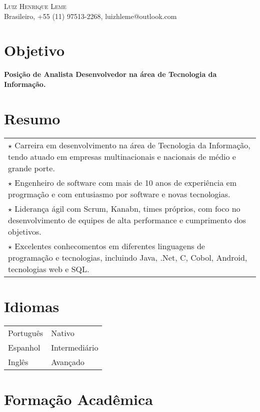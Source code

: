 \documentclass[a4paper, oneside, final]{scrartcl}
\newcommand{\vspc}{\vspace{0.15cm}} %
\begin{document}
\begin{center}
\textsc{\Huge{Luiz Henrique Leme}} \vspc\\
{\small Brasileiro, +55 (11) 97513-2268, luizhleme@outlook.com}

\section{Objetivo}
	{\large \bf Posição de Analista Desenvolvedor na área de Tecnologia da Informação.}
	
\section{Resumo}

\begin{tabularx}{1\linewidth}{X}
	$\star$ Carreira em desenvolvimento na área de Tecnologia da Informação, tendo atuado em empresas multinacionais e nacionais de médio e grande porte. \vspc\\
	
	$\star$ Engenheiro de software com mais de 10 anos de experiência em progrmação e com entusiasmo por software e novas tecnologias. \vspc\\
	
	$\star$ Liderança ágil com Scrum, Kanabn, times próprios, com foco no desenvolvimento de equipes de alta performance e cumprimento dos objetivos. \vspc\\
	
	$\star$ Excelentes conhecomentos em diferentes linguagens de programação e tecnologias, incluindo Java, .Net, C, Cobol, Android, tecnologias web e SQL. \vspc\\	
\end{tabularx}


\section{Idiomas}

\begin{tabularx}{1\linewidth}{p{5cm}X}
Português  & Nativo \\
Espanhol   & Intermediário \\  
Inglês     & Avançado\\
\end{tabularx}

\section{Formação Acadêmica}


\end{center}
\end{document}
